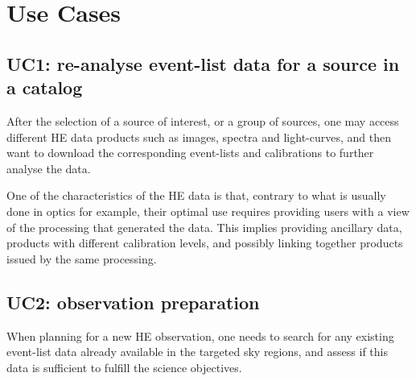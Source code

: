 \documentclass[11pt,a4paper]{ivoa}
\begin{document}



\section{Use Cases}

\subsection{UC1: re-analyse event-list data for a source in a catalog}

After the selection of a source of interest, or a group of sources, one may access different HE data products such as images, spectra and light-curves, and then want to download the corresponding event-lists and calibrations to further analyse the data.

One of the characteristics of the HE data is that, contrary to what is usually done in optics for example, their optimal use requires providing users with a view of the processing that generated the data. This implies providing ancillary data, products with different calibration levels, and possibly linking together products issued by the same processing.


\subsection{UC2: observation preparation}

When planning for a new HE observation, one needs to search for any existing event-list data already available in the targeted sky regions, and assess if this data is sufficient to fulfill the science objectives.

\end{document}
